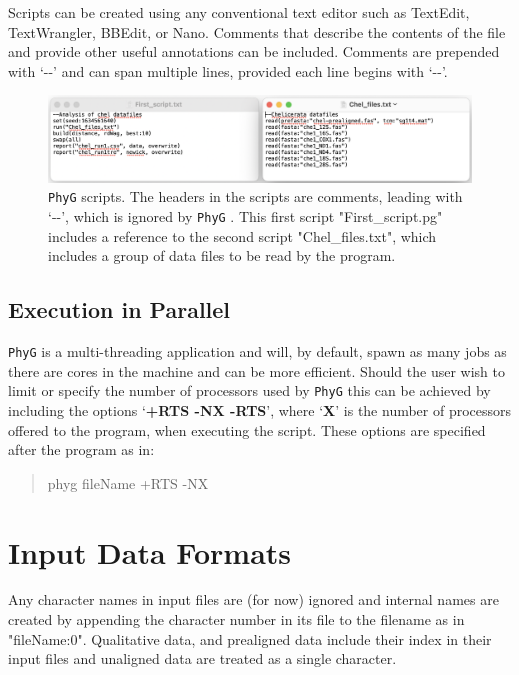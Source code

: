 \documentclass[11pt]{book}
\newcommand{\phyg}{\texttt{PhyG} }
\begin{document}
{{		Scripts can be created using any conventional text editor such as TextEdit, TextWrangler, 
		BBEdit, or Nano. Comments that describe the contents of the file and provide other useful 
		annotations can be included. Comments are prepended with `-{}-' and can span multiple 
		lines, provided each line begins with `-{}-'. 

		\begin{figure}[H]
		\centering
		\includegraphics[width=\textwidth]{First_run.jpg}
		\caption{\phyg scripts. The headers in the scripts are comments, leading with `-{}-', which is 
		ignored by \phyg. This first script "First\_script.pg" includes a reference to the second script
		"Chel\_files.txt", which includes a group of data files to be read by the program.}
		\label{firstscript}
		\end{figure}

	
	\subsection{Execution in Parallel}
		\label{subsec:parallel}
		\phyg is a multi-threading application and will, by default, spawn as many jobs as there 
		are cores in the machine and can be more efficient. Should the user wish to limit or 
		specify the number of processors used by \phyg this can be achieved by including the options 
		`\textbf{+RTS -NX -RTS}', where `\textbf{X}' is the number of processors offered to the 
		program, when executing the script. These options are specified after the program as in:
		
		\begin{quote}
		phyg fileName +RTS -NX 
		\end{quote}
		

		
	\section{Input Data Formats} 
	Any character names in input files are (for now) ignored and internal names are created
	by appending the character number in its file to the filename as in "fileName:0".
	Qualitative data, and prealigned data include their index in their input files and unaligned 
	data are treated as a single character.
		
}}
\end{document}

